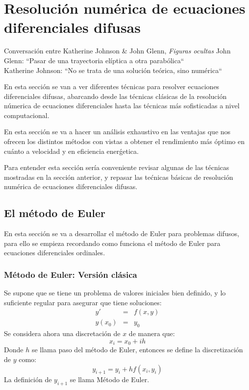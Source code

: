 \chapter{Resolución numérica de ecuaciones diferenciales difusas}
\begin{chapquote}{Conversación entre Katherine Johnson \& John Glenn, \textit{Figuras ocultas}}
	John Glenn: ``Pasar de una trayectoria elíptica a otra parabólica`` \\
	Katherine Johnson: ``No se trata de una solución teórica, sino numérica`` \cite{eulernasa}
\end{chapquote}

En esta sección se van a ver diferentes técnicas para resolver ecuaciones diferenciales difusas, abarcando desde las técnicas clásicas de la resolución númerica de ecuaciones diferenciales hasta las técnicas más sofisticadas a nivel computacional.

En esta sección se va a hacer un análisis exhaustivo en las ventajas que nos ofrecen los distintos métodos con vistas a obtener el rendimiento más óptimo en cuánto a velocidad y en eficiencia enerǵetica.

Para entender esta sección sería conveniente revisar algunas de las técnicas mostradas en la sección anterior, y repasar las tećnicas básicas de resolución numérica de ecuaciones diferenciales difusas.

\section{El método de Euler}
En esta sección se va a desarrollar el método de Euler para problemas difusos, para ello se empieza recordando como funciona el método de Euler para ecuaciones diferenciales ordinales.

\subsection{Método de Euler: Versión clásica}
Se supone que se tiene un problema de valores iniciales bien definido, y lo suficiente regular para asegurar que tiene soluciones:
\[
\begin{array}{ccc}
	y' & = &f(x, y)  \\
	y(x_0) & = & y_0
\end{array}
\]
Se considera ahora una discretación de $x$ de manera que:
\[
	x_i = x_0 + i h
\]
Donde $h$ se llama paso del método de Euler, entonces se define la discretización de $y$ como:
\[
	y_{i+1} = y_i + h f(x_i, y_i)
\]
La definición de $y_{i+1}$ se llama Método de Euler.

